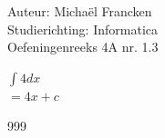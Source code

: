 \documentclass[a4paper]{article}
\begin{document}
\noindent \large Auteur: Michaël Francken \\
\noindent \large Studierichting: Informatica\\
\noindent \large Oefeningenreeks 4A nr. 1.3\\

\medskip

\normalsize

$\displaystyle\int 4dx$\\

$=4x+c$\\

\begin{thebibliography}{999}
\end{thebibliography}
\end{document}
